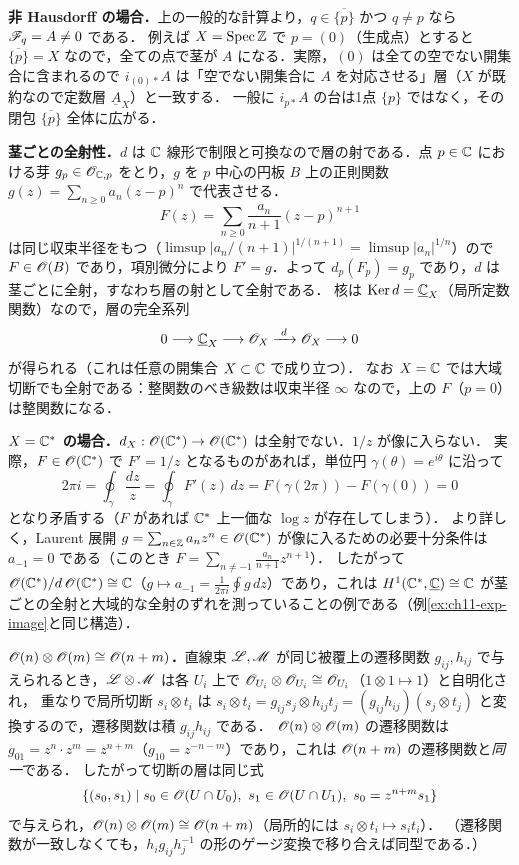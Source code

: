 \textbf{非 Hausdorff の場合．}上の一般的な計算より，$q\in\overline{\{p\}}$ かつ $q\neq p$ なら $\mathscr{F}_q=A\neq0$ である．
例えば $X=\operatorname{Spec}\mathbb{Z}$ で $p=(0)$（生成点）とすると $\overline{\{p\}}=X$ なので，全ての点で茎が $A$ になる．実際，$(0)$ は全ての空でない開集合に含まれるので $i_{(0)*}A$ は「空でない開集合に $A$ を対応させる」層（$X$ が既約なので定数層 $\underline{A}_X$）と一致する．
一般に $i_{p*}A$ の台は1点 $\{p\}$ ではなく，その閉包 $\overline{\{p\}}$ 全体に広がる．

\textbf{茎ごとの全射性．}$d$ は $\mathbb{C}$ 線形で制限と可換なので層の射である．点 $p\in\mathbb{C}$ における芽 $g_p\in\mathscr{O}_{\mathbb{C},p}$ をとり，$g$ を $p$ 中心の円板 $B$ 上の正則関数 $g(z)=\sum_{n\ge0}a_n(z-p)^n$ で代表させる．
\[
  F(z)=\sum_{n\ge0}\frac{a_n}{n+1}(z-p)^{n+1}
\]
は同じ収束半径をもつ（$\limsup|a_n/(n+1)|^{1/(n+1)}=\limsup|a_n|^{1/n}$）ので $F\in\mathscr{O}(B)$ であり，項別微分により $F'=g$．よって $d_p(F_p)=g_p$ であり，$d$ は茎ごとに全射，すなわち層の射として全射である．
核は $\operatorname{Ker} d=\underline{\mathbb{C}}_X$（局所定数関数）なので，層の完全系列
\[
  0\longrightarrow\underline{\C}_X\longrightarrow\OO_X\xrightarrow{\ d\ }\OO_X\longrightarrow0
\]
が得られる（これは任意の開集合 $X\subset\mathbb{C}$ で成り立つ）．
なお $X=\mathbb{C}$ では大域切断でも全射である：整関数のべき級数は収束半径 $\infty$ なので，上の $F$（$p=0$）は整関数になる．

\textbf{$X=\mathbb{C}^*$ の場合．}$d_X:\mathscr{O}(\mathbb{C}^*)\to\mathscr{O}(\mathbb{C}^*)$ は全射でない．$1/z$ が像に入らない．
実際，$F\in\mathscr{O}(\mathbb{C}^*)$ で $F'=1/z$ となるものがあれば，単位円 $\gamma(\theta)=e^{i\theta}$ に沿って
\[
  2\pi i=\oint_\gamma\frac{dz}{z}=\oint_\gamma F'(z)\,dz=F(\gamma(2\pi))-F(\gamma(0))=0
\]
となり矛盾する（$F$ があれば $\mathbb{C}^*$ 上一価な $\log z$ が存在してしまう）．
より詳しく，Laurent 展開 $g=\sum_{n\in\mathbb{Z}}a_nz^n\in\mathscr{O}(\mathbb{C}^*)$ が像に入るための必要十分条件は $a_{-1}=0$ である（このとき $F=\sum_{n\neq-1}\frac{a_n}{n+1}z^{n+1}$）．
したがって $\mathscr{O}(\mathbb{C}^*)/d\,\mathscr{O}(\mathbb{C}^*)\cong\mathbb{C}$（$g\mapsto a_{-1}=\frac{1}{2\pi i}\oint g\,dz$）であり，これは $H^1(\mathbb{C}^*,\underline{\mathbb{C}})\cong\mathbb{C}$ が茎ごとの全射と大域的な全射のずれを測っていることの例である（例\ref{ex:ch11-exp-image}と同じ構造）．

\textbf{$\mathscr{O}(n)\otimes\mathscr{O}(m)\cong\mathscr{O}(n+m)$．}直線束 $\mathscr{L},\mathscr{M}$ が同じ被覆上の遷移関数 $g_{ij},h_{ij}$ で与えられるとき，$\mathscr{L}\otimes\mathscr{M}$ は各 $U_i$ 上で $\mathscr{O}_{U_i}\otimes\mathscr{O}_{U_i}\cong\mathscr{O}_{U_i}$（$1\otimes1\mapsto1$）と自明化され，
重なりで局所切断 $s_i\otimes t_i$ は $s_i\otimes t_i=g_{ij}s_j\otimes h_{ij}t_j=(g_{ij}h_{ij})(s_j\otimes t_j)$ と変換するので，遷移関数は積 $g_{ij}h_{ij}$ である．
$\mathscr{O}(n)\otimes\mathscr{O}(m)$ の遷移関数は $g_{01}=z^n\cdot z^m=z^{n+m}$（$g_{10}=z^{-n-m}$）であり，これは $\mathscr{O}(n+m)$ の遷移関数と\emph{同一}である．
したがって切断の層は同じ式
\[
  \{(s_0,s_1)\mid s_0\in\OO(U\cap U_0),\ s_1\in\OO(U\cap U_1),\ s_0=z^{n+m}s_1\}
\]
で与えられ，$\mathscr{O}(n)\otimes\mathscr{O}(m)\cong\mathscr{O}(n+m)$（局所的には $s_i\otimes t_i\mapsto s_it_i$）．
（遷移関数が一致しなくても，$h_ig_{ij}h_j^{-1}$ の形のゲージ変換で移り合えば同型である．）


